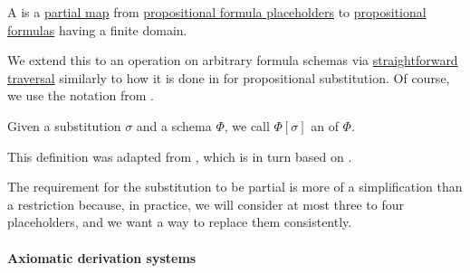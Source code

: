 \begin{definition}\label{def:propositional_schema_substitution}\mimprovised
  A  is a \hyperref[def:set_valued_map/partial]{partial map} from \hyperref[def:propositional_formula_schema]{propositional formula placeholders} to \hyperref[def:propositional_formula]{propositional formulas} having a finite domain.

  We extend this to an operation on arbitrary formula schemas via \hyperref[rem:straightforward_traversal]{straightforward traversal} similarly to how it is done in  for propositional substitution. Of course, we use the notation from .

  Given a substitution \( \sigma \) and a schema \( \Phi \), we call \( \Phi[\sigma] \) an  of \( \Phi \).
\end{definition}
\begin{comments}
  \item This definition was adapted from , which is in turn based on \cite[def. 3.1.3]{CitkinMuravitsky2021}.

  \item The requirement for the substitution to be partial is more of a simplification than a restriction because, in practice, we will consider at most three to four placeholders, and we want a way to replace them consistently.
\end{comments}

\paragraph{Axiomatic derivation systems}

